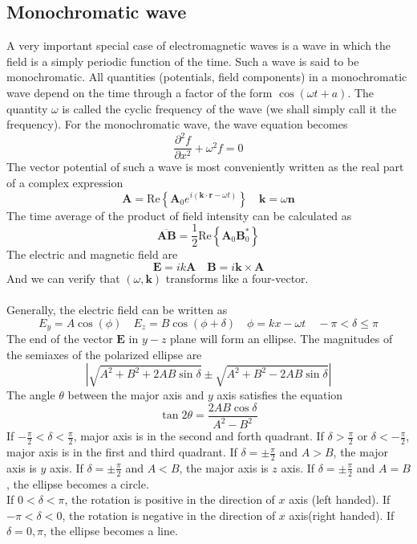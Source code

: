\subsection{Monochromatic wave}
A very important special case of electromagnetic waves is a wave in which the field is a simply periodic function of the time. Such a wave is said to be monochromatic. All quantities
(potentials, field components) in a monochromatic wave depend on the time through a factor of the form $\cos(\omega t + a)$. The quantity $\omega$ is called the cyclic frequency of the wave (we shall simply call it the frequency). For the monochromatic wave, the wave equation becomes
\[\frac{\partial^2 f}{\partial x^2} +	 \omega^2 f = 0\]
The vector potential of such a wave is most conveniently written as the real part of a complex expression
\[\bm{A} = \mathrm{Re}\left\{ \bm{A}_0 e^{i(\bm{k}\cdot\bm{r}-\omega t)}\right\} \quad \bm{k} = \omega \bm{n}\]
The time average of the product of field intensity can be calculated as
\[\overline{\bm{A}\bm{B}} = \frac{1}{2}\mathrm{Re}\left\{ \bm{A}_0 \bm{B}_0^*\right\}\]
The electric and magnetic field are
\[\bm{E} = ik\bm{A} \quad \bm{B} = i\bm{k}\times\bm{A}\]
And we can verify that $(\omega,\bm{k})$ transforms like a four-vector.
\\ \\
Generally, the electric field can be  written as
\[E_y = A\cos(\phi) \quad E_z = B\cos(\phi + \delta) \quad \phi= kx -\omega t   \quad -\pi < \delta \leq \pi\]
The end of the vector $\bm{E}$ in $y-z$ plane will form an ellipse. The magnitudes of the semiaxes of the polarized ellipse are
\[|\sqrt{A^2+B^2+2AB\sin\delta} \pm \sqrt{A^2+B^2-2AB\sin\delta}|\]
The angle $\theta$ between the major axis and $y$ axis satisfies the equation
\[\tan 2\theta = \frac{2AB\cos\delta}{A^2-B^2}\]
If $-\frac{\pi}{2} < \delta < \frac{\pi}{2}$, major axis is in the second and forth quadrant. If $\delta > \frac{\pi}{2}$ or $\delta < -\frac{\pi}{2}$, major axis is in the first and third quadrant. If $\delta = \pm \frac{\pi}{2}$ and $A>B$, the major axis is $y$ axis. If $\delta = \pm \frac{\pi}{2}$ and $A<B$, the major axis is $z$ axis. If $\delta = \pm \frac{\pi}{2}$ and $A=B$, the ellipse becomes a circle.\\ 
If $0 < \delta < \pi$, the rotation is positive in the direction of $x$ axis (left handed). If $-\pi < \delta < 0$, the rotation is negative in the direction of $x$ axis(right handed). If $\delta = 0,\pi$, the ellipse becomes a line.\\ \\
